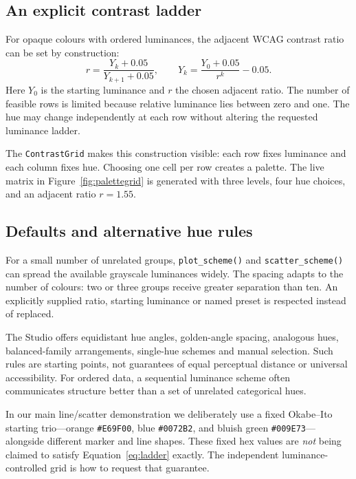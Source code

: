 \documentclass[10pt,twocolumn,a4paper]{article}
\begin{document}
\subsection{An explicit contrast ladder}
For opaque colours with ordered luminances, the adjacent
WCAG contrast ratio can be set by construction:
\begin{equation}
 r=\frac{Y_k+0.05}{Y_{k+1}+0.05},\qquad
 Y_k=\frac{Y_0+0.05}{r^k}-0.05 .
 \label{eq:ladder}
\end{equation}
Here $Y_0$ is the starting luminance and $r$ the chosen
adjacent ratio. The number of feasible rows is limited
because relative luminance lies between zero and one.
The hue may change independently at each row without
altering the requested luminance ladder.

The \texttt{ContrastGrid} makes this construction visible:
each row fixes luminance and each column fixes hue.
Choosing one cell per row creates a palette. The live
matrix in Figure~\ref{fig:palettegrid} is generated with
three levels, four hue choices, and an adjacent ratio
$r=1.55$.



\subsection{Defaults and alternative hue rules}
For a small number of unrelated groups,
\texttt{plot\_scheme()} and \texttt{scatter\_scheme()}
can spread the available grayscale luminances widely.
The spacing adapts to the number of colours: two or
three groups receive greater separation than ten.
An explicitly supplied ratio, starting luminance or
named preset is respected instead of replaced.

The Studio offers equidistant hue angles, golden-angle
spacing, analogous hues, balanced-family arrangements,
single-hue schemes and manual selection. Such rules are
starting points, not guarantees of equal perceptual
distance or universal accessibility. For ordered data,
a sequential luminance scheme often communicates
structure better than a set of unrelated categorical hues.

In our main line/scatter demonstration we deliberately
use a fixed Okabe--Ito starting trio---orange
\texttt{\#E69F00}, blue \texttt{\#0072B2}, and
bluish green \texttt{\#009E73}---alongside different
marker and line shapes. These fixed hex values are
\emph{not} being claimed to satisfy
Equation~\ref{eq:ladder} exactly. The independent
luminance-controlled grid is how to request that guarantee.
\end{document}
